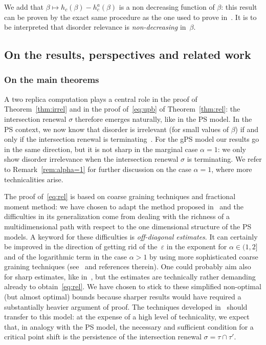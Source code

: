 \documentclass[AHL,Unicode,longabstracts]{cedram}
\newcommand{\ga}{\alpha}
\newcommand{\gb}{\beta}
\newcommand{\gep}{\varepsilon}
\begin{document}
We add that $\gb\mapsto h_c(\gb)-h_c^{a}(\gb)$ is a non decreasing function of $\beta$: this result can be proven by the exact same procedure as the one used to prove in~\cite[Proposition~6.1]{cf:GLT11}. It is to be interpreted that disorder relevance is \emph{non-decreasing} in~$\beta$.

\subsection{On the results, perspectives and related work}\label{sec:misc}

\subsubsection{On the main theorems}

A two replica computation plays a central role in the proof of Theorem~\ref{thm:irrel} and in the proof of~\eqref{eq:upb} of Theorem~\ref{thm:rel}: the intersection renewal $\sigma$ therefore emerges naturally, like in the PS model. In the PS context, we now know that disorder is irrelevant (for small values of $\gb$) if and only if the intersection renewal is terminating~\cite{cf:BL16}. For the gPS model our results go in the same direction, but it is not sharp in the marginal case $\ga=1$: we only show disorder irrelevance when the intersection renewal $\sigma$ is terminating. We refer to Remark~\ref{rem:alpha=1} for further discussion on the case $\ga=1$, where more technicalities arise.

The proof of~\eqref{eq:rel} is based on coarse graining techniques and fractional moment method: we have chosen to adapt the method proposed in~\cite{cf:DGLT09} and the difficulties in its generalization come from dealing with the richness of a multidimensional path with respect to the one dimensional structure of the PS models. A keyword for these difficulties is \emph{off-diagonal estimates}. It can certainly be improved in the direction of getting rid of the~$\gep$ in the exponent for $\ga \in (1, 2]$ and of the logarithmic term in the case $\ga >1$ by using more sophisticated coarse graining techniques (see~\cite[Chapter~6]{cf:G} and references therein). One could probably aim also for sharp estimates, like in~\cite{cf:BL16}, but the estimates are technically rather demanding already to obtain~\eqref{eq:rel}. We have chosen to stick to these simplified non-optimal (but almost optimal) bounds because sharper results would have required a substantially heavier argument of proof. The techniques developed in~\cite{cf:BL16bis,cf:BL16} should transfer to this model: at the expense of a high level of technicality, we expect that, in analogy with the PS model, the necessary and sufficient condition for a critical point shift is the persistence of the intersection renewal $\sigma=\tau\cap\tau'$.
\end{document}
